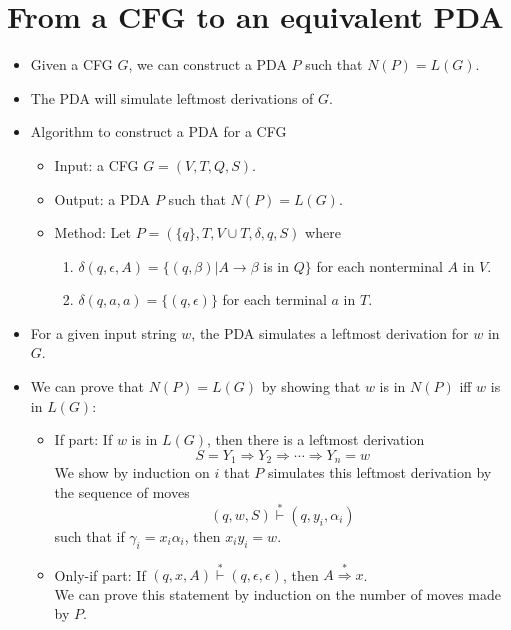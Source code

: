 \documentclass[]{article}
\begin{document}
\section{From a CFG to an equivalent PDA}
  \begin{itemize}
    \item Given a CFG $G$, we can construct a PDA $P$ such that $N(P) = L(G)$.
    \item The PDA will simulate leftmost derivations of $G$.
    \item Algorithm to construct a PDA for a CFG
      \begin{itemize}
        \item Input: a CFG $G = (V,T,Q,S)$.
        \item Output: a PDA $P$ such that $N(P) = L(G)$.
        \item Method: Let $P = (\{q\},T,V\cup T,\delta,q,S)$ where
          \begin{enumerate}
            \item $\delta(q,\epsilon,A) = \{(q,\beta)|A\rightarrow\beta$ is 
            in $Q \}$ for each nonterminal $A$ in $V$.
            \item $\delta(q,a,a) = \{(q,\epsilon)\}$ for each terminal $a$ in 
            $T$.
          \end{enumerate}
      \end{itemize}
    \item For a given input string $w$, the PDA simulates a leftmost derivation
    for $w$ in $G$.
    \item We can prove that $N(P) = L(G)$ by showing that $w$ is in $N(P)$ iff 
    $w$ is in $L(G)$:
      \begin{itemize}
        \item If part: If $w$ is in $L(G)$, then there is a leftmost derivation
          \[ S = Y_1 \Rightarrow Y_2 \Rightarrow \cdots \Rightarrow Y_n = w \]
        We show by induction on $i$ that $P$ simulates this leftmost derivation
        by the sequence of moves 
          \[ (q,w,S) \overset{*}{\vdash} (q,y_i,\alpha_i) \]
        such that if $\gamma_i = x_i\alpha_i$, then $x_iy_i = w$.
        \item Only-if part: If $(q,x,A) \overset{*}{\vdash} (q,\epsilon,
        \epsilon)$, then $A \overset{*}{\Rightarrow} x$. \\
        We can prove this statement by induction on the number of moves made by 
        $P$.
      \end{itemize}
  \end{itemize}
\end{document}
